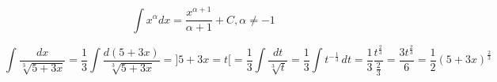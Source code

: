 \documentclass[../rgr1.tex]{subfiles}
\begin{document}
\Solution

$$
	\int x^{\alpha}dx = \frac{ x^{\alpha + 1} }{ \alpha + 1 } + C, \alpha \neq -1
$$

\begin{dmath}
	\int\frac{dx}{ \sqrt[3]{5+3x} } =
	\frac{1}{3}\int\frac{d (5 + 3x) }{ \sqrt[3]{5+3x} } =
	\Big]
	5 + 3x = t
	\Big[
	= \frac{1}{3}\int\frac{d t}{ \sqrt[3]{t} } =
	\frac{1}{3}\int t^{ -\frac{1}{3} } \, dt =
	\frac{1}{3}
	\frac{t^{ \frac{2}{3} } }{ \frac{2}{3} } =
	\frac{3 t^{ \frac{2}{3} } }{ 6 } =
	\frac{1}{ 2 }(5+3x)^{ \frac{2}{3} }
\end{dmath}

\end{document}
